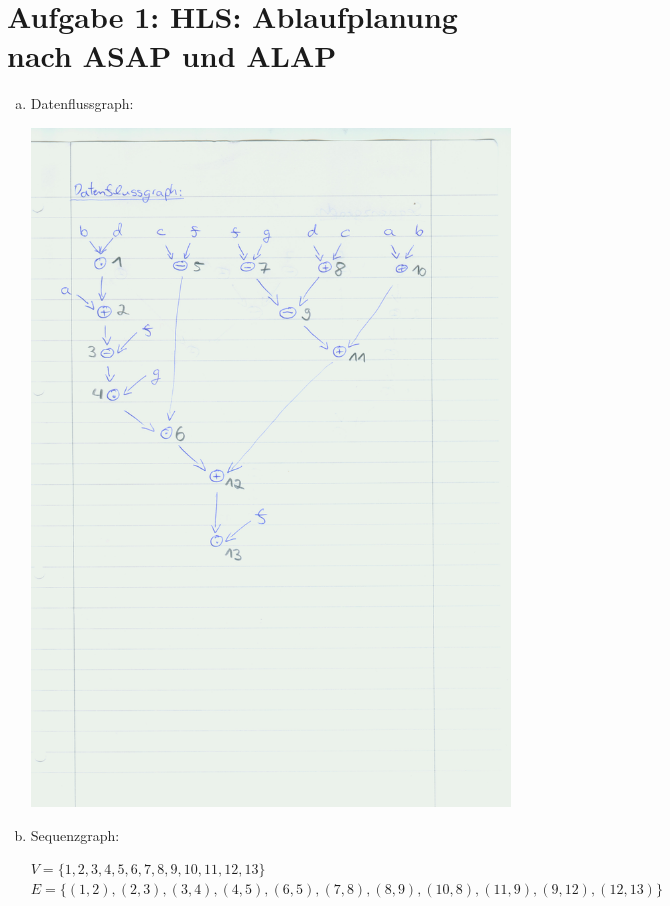 \documentclass[a4paper]{scrartcl}
\begin{document}
	
\section*{Aufgabe 1: HLS: Ablaufplanung nach ASAP und ALAP}

\begin{enumerate}[(a)]
	\item Datenflussgraph:	
	
	\includegraphics[scale=0.7]{Image121}
	\newpage
	\item Sequenzgraph:
	
	$V = \{1,2,3,4,5,6,7,8,9,10,11,12,13\}$\\
	$E = \{(1,2),(2,3),(3,4),(4,5),(6,5), (7,8),(8,9), (10,8), (11,9), (9,12), (12,13) \}$


\end{enumerate}
\end{document}
